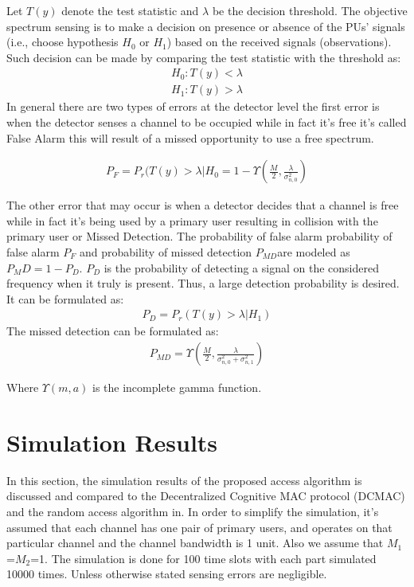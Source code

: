 \documentclass[twocolumn]{el-author}
\begin{document}
	Let $ T(y) $ denote the test statistic and $ \lambda $ be the decision threshold. The objective spectrum sensing is to make a decision on presence or absence of the PUs' signals (i.e., choose hypothesis $ H_0 $ or $ H_1 $) based on the received signals (observations). Such decision can be made by comparing the test statistic with the threshold as:
	\begin{align}\label{kondolies}
	H_0 : T(y)< \lambda
	\end{align}
	\begin{align}\label{kondolies}
	H_1 : T(y)> \lambda 
	\end{align}	
	In general there are two types of errors at the detector level the first error is when the detector senses a channel to be occupied while in fact it's free it's called False Alarm this will result of a missed opportunity to use a free spectrum.
	
	\begin{align}\label{kondolies}
	P_F= P_r (T(y)> \lambda|H_0 = 1-\Upsilon (\frac{M}{2},\frac{\lambda }{\sigma ^2_{n,0}})
	\end{align}
	
	
	The other error that may occur is when a detector decides that a channel is free while in fact it's being used by a primary user resulting in collision with the primary user or Missed Detection. The probability of false alarm probability of false alarm ${P} _ {F} $ and probability of missed detection ${P}_{MD }$are modeled as\cite{1447503} $P_MD=1-P_D $. $ P_D $ is the probability of detecting a signal on the considered frequency when it truly is present. Thus, a large detection probability is desired. It can be formulated as: 
	\begin{align}\label{kondolies}
	P_{D}= P_r (T(y)> \lambda|H_1)
	\end{align} 
	The missed detection can be formulated as: 
	\begin{align}\label{kondolies}
	P_{MD} = \Upsilon (\frac{M}{2},\frac{\lambda }{\sigma ^2_{n,0}+\sigma ^2_{n,1}})
	\end{align}	
	
	Where $\Upsilon (m,a)$ is the incomplete gamma function.
	
	
	
	\section{Simulation Results}
	In this section, the simulation results of the proposed access algorithm is discussed and compared to the Decentralized Cognitive MAC protocol (DCMAC)\cite{Zhao2007} and the random access algorithm in\cite{Lan2012}. In order to simplify the simulation, it's assumed that each channel has one pair of primary users, and operates on that particular channel and the channel bandwidth is 1 unit. Also we assume that ${M}_{1}$=${M}_{2}$=1. The simulation is done for 100 time slots with each part simulated 10000 times. Unless otherwise stated sensing errors are negligible.
	
\end{document}
